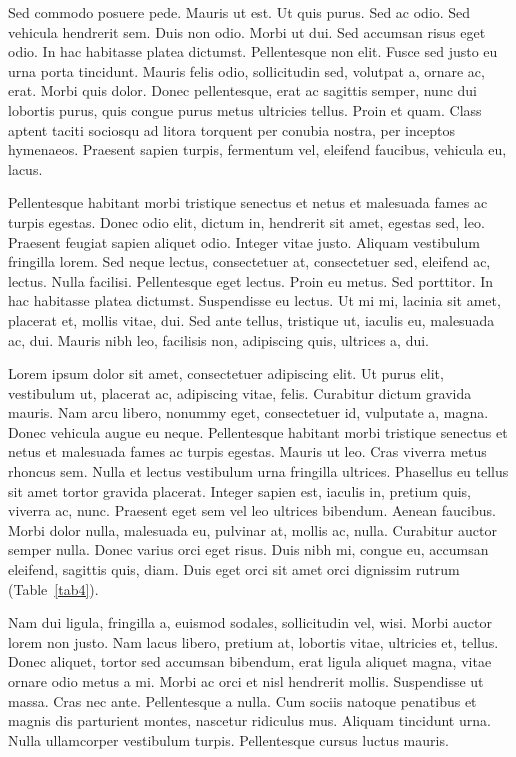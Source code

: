 \documentclass[ASNA,twocolumn]{USG} %
\begin{document}
{Sed commodo posuere pede. Mauris ut est. Ut quis purus. Sed ac odio. Sed vehicula hendrerit sem. Duis non odio.
Morbi ut dui. Sed accumsan risus eget odio. In hac habitasse platea dictumst. Pellentesque non elit. Fusce sed justo
eu urna porta tincidunt. Mauris felis odio, sollicitudin sed, volutpat a, ornare ac, erat. Morbi quis dolor. Donec
pellentesque, erat ac sagittis semper, nunc dui lobortis purus, quis congue purus metus ultricies tellus. Proin et quam.
Class aptent taciti sociosqu ad litora torquent per conubia nostra, per inceptos hymenaeos. Praesent sapien turpis,
fermentum vel, eleifend faucibus, vehicula eu, lacus.

Pellentesque habitant morbi tristique senectus et netus et malesuada fames ac turpis egestas. Donec odio elit,
dictum in, hendrerit sit amet, egestas sed, leo. Praesent feugiat sapien aliquet odio. Integer vitae justo. Aliquam
vestibulum fringilla lorem. Sed neque lectus, consectetuer at, consectetuer sed, eleifend ac, lectus. Nulla facilisi.
Pellentesque eget lectus. Proin eu metus. Sed porttitor. In hac habitasse platea dictumst. Suspendisse eu lectus. Ut
mi mi, lacinia sit amet, placerat et, mollis vitae, dui. Sed ante tellus, tristique ut, iaculis eu, malesuada ac, dui.
Mauris nibh leo, facilisis non, adipiscing quis, ultrices a, dui.


Lorem ipsum dolor sit amet, consectetuer adipiscing elit. Ut purus elit, vestibulum ut, placerat ac, adipiscing vitae,
felis. Curabitur dictum gravida mauris. Nam arcu libero, nonummy eget, consectetuer id, vulputate a, magna. Donec
vehicula augue eu neque. Pellentesque habitant morbi tristique senectus et netus et malesuada fames ac turpis egestas.
Mauris ut leo. Cras viverra metus rhoncus sem. Nulla et lectus vestibulum urna fringilla ultrices. Phasellus eu tellus
sit amet tortor gravida placerat. Integer sapien est, iaculis in, pretium quis, viverra ac, nunc. Praesent eget sem vel
leo ultrices bibendum. Aenean faucibus. Morbi dolor nulla, malesuada eu, pulvinar at, mollis ac, nulla. Curabitur
auctor semper nulla. Donec varius orci eget risus. Duis nibh mi, congue eu, accumsan eleifend, sagittis quis, diam.
Duis eget orci sit amet orci dignissim rutrum (Table~\ref{tab4}).

Nam dui ligula, fringilla a, euismod sodales, sollicitudin vel, wisi. Morbi auctor lorem non justo. Nam lacus libero,
pretium at, lobortis vitae, ultricies et, tellus. Donec aliquet, tortor sed accumsan bibendum, erat ligula aliquet magna,
vitae ornare odio metus a mi. Morbi ac orci et nisl hendrerit mollis. Suspendisse ut massa. Cras nec ante. Pellentesque
a nulla. Cum sociis natoque penatibus et magnis dis parturient montes, nascetur ridiculus mus. Aliquam tincidunt
urna. Nulla ullamcorper vestibulum turpis. Pellentesque cursus luctus mauris.

}
\end{document}
